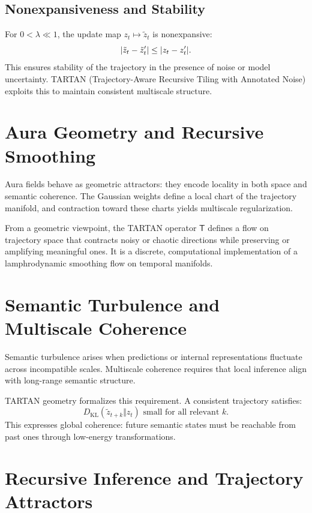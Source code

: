 \documentclass[12pt]{article}
\theoremstyle{plain}
\theoremstyle{definition}
\theoremstyle{remark}
\newcommand{\TartanOp}{\mathsf{T}}
\begin{document}
\subsection{Nonexpansiveness and Stability}

For $0 < \lambda \ll 1$, the update map $z_t \mapsto \tilde{z}_t$ is 
nonexpansive:
\[
\abs{\tilde{z}_t - \tilde{z}_t'}
\le \abs{z_t - z_t'}.
\]
This ensures stability of the trajectory in the presence of noise or 
model uncertainty. TARTAN (Trajectory-Aware Recursive Tiling with Annotated
Noise) exploits this to maintain consistent multiscale structure.

\section{Aura Geometry and Recursive Smoothing}

Aura fields behave as geometric attractors: they encode locality in both 
space and semantic coherence. The Gaussian weights define a local chart of
the trajectory manifold, and contraction toward these charts yields 
multiscale regularization.

From a geometric viewpoint, the TARTAN operator $\TartanOp$ defines a 
flow on trajectory space that contracts noisy or chaotic directions 
while preserving or amplifying meaningful ones. It is a discrete, 
computational implementation of a lamphrodynamic smoothing flow 
on temporal manifolds.

\section{Semantic Turbulence and Multiscale Coherence}

Semantic turbulence arises when predictions or internal representations fluctuate 
across incompatible scales. Multiscale coherence requires that local inference 
align with long-range semantic structure.

TARTAN geometry formalizes this requirement. A consistent trajectory satisfies:
\[
D_{\mathrm{KL}}(\tilde{z}_{t+k} \Vert z_t) \text{ small for all relevant } k.
\]
This expresses global coherence: future semantic states must be reachable from 
past ones through low-energy transformations.

\section{Recursive Inference and Trajectory Attractors}
\end{document}
